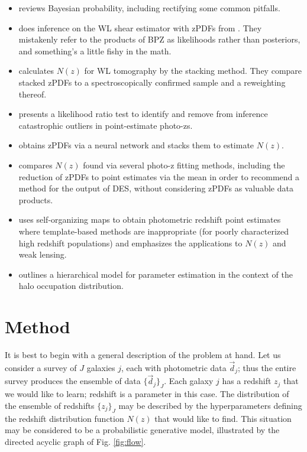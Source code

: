 \documentclass[preprint]{aastex}
\begin{document}
\begin{itemize}
\item \citet{hog12} reviews Bayesian probability, including rectifying some 
common pitfalls.
\item \citet{app12} does inference on the WL shear estimator with zPDFs from 
\citet{kel12}.  They mistakenly refer to the products of BPZ as likelihoods 
rather than posteriors, and something's a little fishy in the math.
\item \citet{ben12} calculates $N(z)$ for WL tomography by the stacking method. 
 They compare stacked zPDFs to a spectroscopically confirmed sample and a 
reweighting thereof.
\item \citet{gor13} presents a likelihood ratio test to identify and remove 
from inference catastrophic outliers in point-estimate photo-zs.
\item \citet{bon13} obtains zPDFs via a neural network and stacks them to 
estimate $N(z)$.
\item \citet{bon15} compares $N(z)$ found via several photo-z fitting methods, 
including the reduction of zPDFs to point estimates via the mean in order to 
recommend a method for the output of DES, without considering zPDFs as valuable 
data products.
\item \citet{mas15} uses self-organizing maps to obtain photometric redshift 
point estimates where template-based methods are inappropriate (for poorly 
characterized high redshift populations) and emphasizes the applications to 
$N(z)$ and weak lensing.
\item \citet{mar15} outlines a hierarchical model for parameter estimation in 
the context of the halo occupation distribution.
\end{itemize}

\clearpage
\section{Method}
\label{sec:meth}

It is best to begin with a general description of the problem at hand.  Let us 
consider a survey of $J$ galaxies $j$, each with photometric data 
$\vec{d}_{j}$; thus the entire survey produces the ensemble of data 
$\{\vec{d}_{j}\}_{J}$.  Each galaxy $j$ has a redshift $z_{j}$ that we would 
like to learn; redshift is a parameter in this case.  The distribution of the 
ensemble of redshifts $\{z_{j}\}_{J}$ may be described by the hyperparameters 
defining the redshift distribution function $N(z)$ that would like to find.  
This situation may be considered to be a probabilistic generative model, 
illustrated by the directed acyclic graph of Fig. \ref{fig:flow}.  
\end{document}
